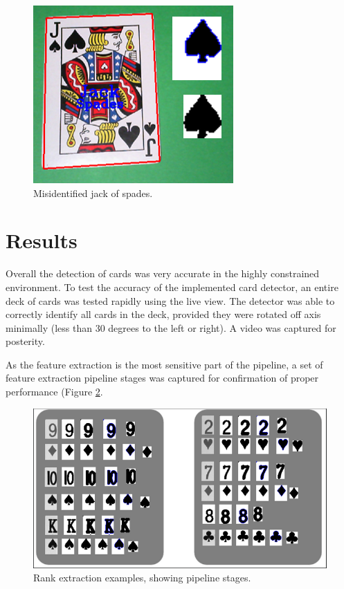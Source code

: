 \documentclass[conference]{IEEEtran}
\begin{document}
\begin{figure}[htbp]
\centerline{\includegraphics[width=\columnwidth]{good-jack.png}}
\caption{Misidentified jack of spades.}
\label{fig:good-jack}
\end{figure}

\section{Results}
Overall the detection of cards was very accurate in the highly constrained environment. To test the
accuracy of the implemented card detector, an entire deck of cards was tested rapidly using the live
view. The detector was able to correctly identify all cards in the deck, provided they were rotated
off axis minimally (less than 30 degrees to the left or right). A video was captured for posterity.

As the feature extraction is the most sensitive part of the pipeline, a set of feature extraction
pipeline stages was captured for confirmation of proper performance (Figure
\ref{fig:rank-extraction}.

\begin{figure}[htbp]
\centerline{\includegraphics[width=\columnwidth]{rank-extraction.png}}
\caption{Rank extraction examples, showing pipeline stages.}
\label{fig:rank-extraction}
\end{figure}
\end{document}
